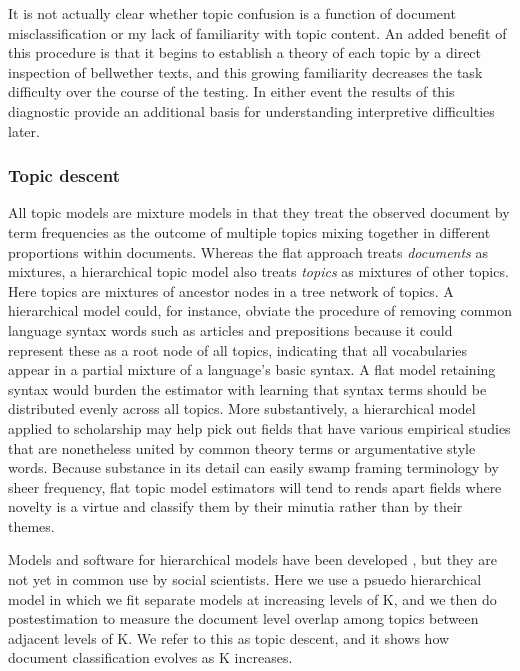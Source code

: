 \documentclass[]{book}
\theoremstyle{definition}
\theoremstyle{definition}
\theoremstyle{definition}
\theoremstyle{remark}
\begin{document}
It is not actually clear whether topic confusion is a function of
document misclassification or my lack of familiarity with topic content.
An added benefit of this procedure is that it begins to establish a
theory of each topic by a direct inspection of bellwether texts, and
this growing familiarity decreases the task difficulty over the course
of the testing. In either event the results of this diagnostic provide
an additional basis for understanding interpretive difficulties later.

\hypertarget{topic-descent}{%
\subsubsection{Topic descent}\label{topic-descent}}

All topic models are mixture models in that they treat the observed
document by term frequencies as the outcome of multiple topics mixing
together in different proportions within documents. Whereas the flat
approach treats \emph{documents} as mixtures, a hierarchical topic model
also treats \emph{topics} as mixtures of other topics. Here topics are
mixtures of ancestor nodes in a tree network of topics. A hierarchical
model could, for instance, obviate the procedure of removing common
language syntax words such as articles and prepositions because it could
represent these as a root node of all topics, indicating that all
vocabularies appear in a partial mixture of a language's basic syntax. A
flat model retaining syntax would burden the estimator with learning
that syntax terms should be distributed evenly across all topics. More
substantively, a hierarchical model applied to scholarship may help pick
out fields that have various empirical studies that are nonetheless
united by common theory terms or argumentative style words. Because
substance in its detail can easily swamp framing terminology by sheer
frequency, flat topic model estimators will tend to rends apart fields
where novelty is a virtue and classify them by their minutia rather than
by their themes.

Models and software for hierarchical models have been developed
\citep{Teh2006Hierarchical, Roberts2015pkg}, but they are not yet in
common use by social scientists. Here we use a psuedo hierarchical model
in which we fit separate models at increasing levels of K, and we then
do postestimation to measure the document level overlap among topics
between adjacent levels of K. We refer to this as topic descent, and it
shows how document classification evolves as K increases.
\end{document}
